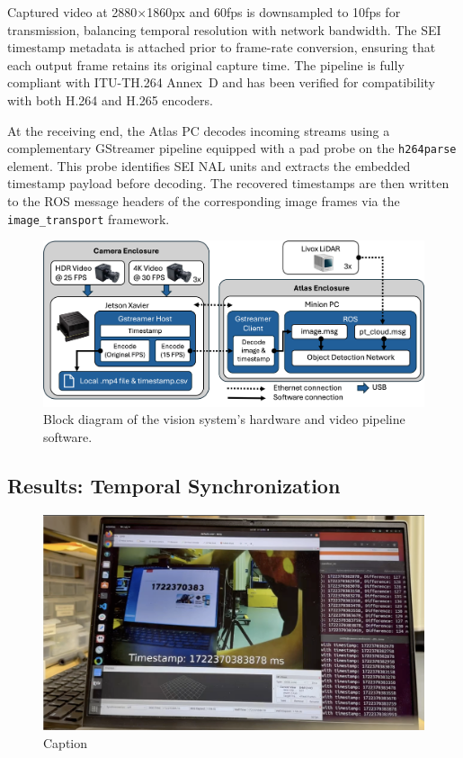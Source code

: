 \documentclass{erauthesis}
\begin{document}
Captured video at 2880×1860px and 60fps is downsampled to 10fps for transmission, balancing temporal resolution with network bandwidth. The SEI timestamp metadata is attached prior to frame-rate conversion, ensuring that each output frame retains its original capture time.
The pipeline is fully compliant with ITU-TH.264 Annex~D and has been verified for compatibility with both H.264 and H.265 encoders.

At the receiving end, the Atlas PC decodes incoming streams using a complementary GStreamer pipeline equipped with a pad probe on the \texttt{h264parse} element. This probe identifies SEI NAL units and extracts the embedded timestamp payload before decoding. The recovered timestamps are then written to the ROS message headers of the corresponding image frames via the \texttt{image\_transport} framework.



\begin{figure}[htbp]
\centering
\includegraphics[width=5in]{Images/Video_Block_Diagram.png}
\caption{Block diagram of the vision system's hardware and video pipeline software.}
\label{video_pipeline}
\end{figure}

\subsection{Results: Temporal Synchronization} \label{time_sync_cam}

\begin{figure}[htbp]
    \centering
    \includegraphics[width=0.8\linewidth]{Images/time_sync1.png}
    \caption{Caption}
    \label{fig:time_sync1}
\end{figure}
\end{document}
